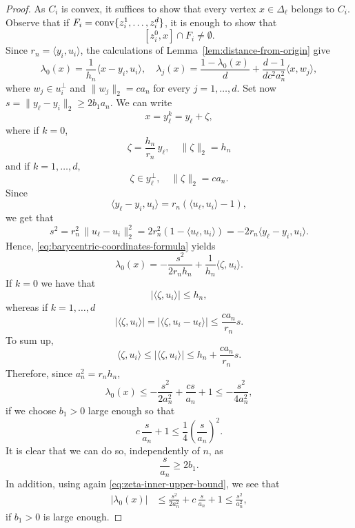 \documentclass[10pt]{amsart}
\newcommand{\1}{\textbf{1}}
\newcommand{\conv}{{\rm conv}}
\numberwithin{equation}{section} %
\theoremstyle{remark}
\theoremstyle{definition}
\begin{document}
\begin{proof}
As $C_i$ is convex, it suffices to show that every vertex $x \in \Delta_\ell$ belongs to $C_i$. Observe that if $F_i=\conv\{z_i^1,\ldots,z_i^d\}$, it is enough to show that \[[z_i^0,x] \cap F_i \neq \emptyset.\] Since $r_n=\langle y_i,u_i\rangle$, the calculations of Lemma~\ref{lem:distance-from-origin} give \begin{equation}\label{eq:barycentric-coordinates-formula}
\lambda_0(x)=\frac{1}{h_n}\langle x-y_i,u_i\rangle, \quad \lambda_j(x)=\frac{1-\lambda_0(x)}{d}+\frac{d-1}{dc^2a_n^2}\langle x,w_j\rangle,\end{equation} where $w_j \in u_i^\perp$ and $\|w_j\|_2=ca_n$ for every $j=1,\ldots,d.$ Set now $s=\|y_\ell-y_i\|_2\geq 2b_1a_n$. We can write \[x=y_\ell^k=y_\ell+\zeta,\] where if $k=0$, \[\zeta=\frac{h_n}{r_n}\,y_\ell, \quad \|\zeta\|_2=h_n\] and if $k=1,\ldots, d,$ \[\zeta \in y_\ell^\perp, \quad \|\zeta\|_2=ca_n. \] Since \[\langle y_\ell-y_i,u_i\rangle=r_n(\langle u_\ell,u_i\rangle-1),\] we get that \[s^2=r_n^2\,\|u_\ell-u_i\|_2^2=2r_n^2(1-\langle u_\ell,u_i \rangle)=-2r_n \langle y_\ell-y_i,u_i\rangle.\] Hence, \eqref{eq:barycentric-coordinates-formula} yields
\[\lambda_0(x)=-\frac{s^2}{2r_nh_n}+\frac{1}{h_n}\langle \zeta,u_i\rangle.\]
If $k=0$ we have that \[|\langle \zeta,u_i \rangle| \leq h_n,\] whereas if $k=1,\ldots,d$ \[|\langle \zeta, u_i\rangle|=|\langle \zeta, u_i-u_\ell\rangle| \leq \frac{ca_n}{r_n}s.\] To sum up,\begin{equation}\label{eq:zeta-inner-upper-bound}
    \langle \zeta,u_i \rangle \leq |\langle \zeta,u_i \rangle| \leq h_n+\frac{ca_n}{r_n}s.
\end{equation}Therefore, since $a_n^2=r_nh_n$, \begin{equation}\label{eq:0-coordinate-upper-bound}    
\lambda_0(x) \leq-\frac{s^2}{2a_n^2}+\frac{cs}{a_n}+1 \leq-\frac{s^2}{4a_n^2},\end{equation}if we choose $b_1>0$ large enough so that \[c\,\frac{s}{a_n}+1 \leq \frac{1}{4}\left(\frac{s}{a_n}\right)^2.\] It is clear that we can  do so, independently of $n$, as \[\frac{s}{a_n} \geq 2b_1.\] In addition, using again \eqref{eq:zeta-inner-upper-bound}, we see that \begin{equation}\label{eq:absolute-0-coordinate}\begin{aligned}
    |\lambda_0(x)| &\leq \frac{s^2}{2a_n^2}+c\,\frac{s}{a_n}+1 \leq \frac{s^2}{a_n^2},
    \end{aligned}
\end{equation} if $b_1>0$ is large enough.


\end{proof}
\end{document}
